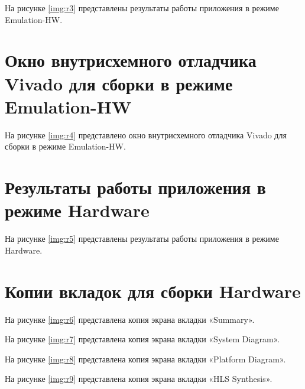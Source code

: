 На рисунке \ref{img:r3} представлены результаты работы приложения в режиме Emulation-HW.



\chapter*{Окно внутрисхемного отладчика Vivado для сборки в режиме Emulation-HW}

На рисунке \ref{img:r4} представлено окно внутрисхемного отладчика Vivado для сборки в режиме Emulation-HW.


\chapter*{Результаты работы приложения в режиме Hardware}

На рисунке \ref{img:r5} представлены результаты работы приложения в режиме Hardware.



\chapter*{Копии вкладок для сборки Hardware}

На рисунке \ref{img:r6} представлена копия экрана вкладки «Summary».

\newpage

На рисунке \ref{img:r7} представлена копия экрана вкладки «System Diagram».

\newpage

На рисунке \ref{img:r8} представлена копия экрана вкладки «Platform Diagram».

\newpage

На рисунке \ref{img:r9} представлена копия экрана вкладки «HLS Synthesis».

\newpage


